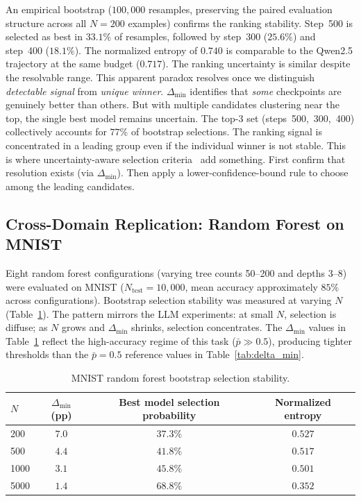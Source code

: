 \documentclass[pdflatex,sn-mathphys-ay,oneside]{sn-jnl}
\theoremstyle{thmstylethree}
\begin{document}
An empirical bootstrap ($100{,}000$ resamples, preserving the paired evaluation structure across all $N=200$ examples) confirms the ranking stability. Step~500 is selected as best in $33.1\%$ of resamples, followed by step~300 ($25.6\%$) and step~400 ($18.1\%$). The normalized entropy of $0.740$ is comparable to the Qwen2.5 trajectory at the same budget ($0.717$). The ranking uncertainty is similar despite the resolvable range. This apparent paradox resolves once we distinguish \emph{detectable signal} from \emph{unique winner}. $\Delta_{\min}$ identifies that \emph{some} checkpoints are genuinely better than others. But with multiple candidates clustering near the top, the single best model remains uncertain. The top-3 set (steps~500,~300,~400) collectively accounts for $77\%$ of bootstrap selections. The ranking signal is concentrated in a leading group even if the individual winner is not stable. This is where uncertainty-aware selection criteria~\citep{du2026stability} add something. First confirm that resolution exists (via $\Delta_{\min}$). Then apply a lower-confidence-bound rule to choose among the leading candidates.

\subsection{Cross-Domain Replication: Random Forest on MNIST}\label{sec:mnist}

Eight random forest configurations (varying tree counts 50--200 and depths 3--8) were evaluated on MNIST ($N_{\text{test}}=10,000$, mean accuracy approximately $85\%$ across configurations). Bootstrap selection stability was measured at varying $N$ (Table~\ref{tab:mnist}). The pattern mirrors the LLM experiments: at small $N$, selection is diffuse; as $N$ grows and $\Delta_{\min}$ shrinks, selection concentrates. The $\Delta_{\min}$ values in Table~\ref{tab:mnist} reflect the high-accuracy regime of this task ($\bar{p}\gg0.5$), producing tighter thresholds than the $\bar{p}=0.5$ reference values in Table~\ref{tab:delta_min}.

\begin{table}[t]
\centering
\caption{MNIST random forest bootstrap selection stability.}
\label{tab:mnist}
\begin{tabular}{lccc}\toprule
$N$ & $\Delta_{\min}$ (pp) & Best model selection probability & Normalized entropy \\\midrule
200  & $7.0$ & $37.3\%$ & $0.527$ \\
500  & $4.4$ & $41.8\%$ & $0.517$ \\
1000 & $3.1$ & $45.8\%$ & $0.501$ \\
5000 & $1.4$ & $68.8\%$ & $0.352$ \\\bottomrule
\end{tabular}
\end{table}
\end{document}
